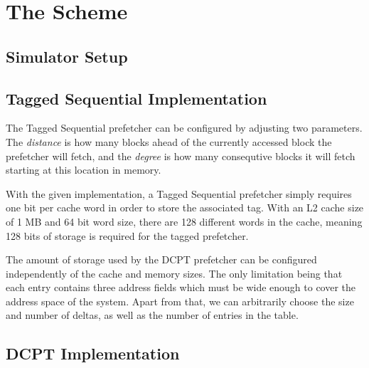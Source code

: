 \section{The Scheme}


\subsection{Simulator Setup}


\subsection{Tagged Sequential Implementation}


The Tagged Sequential prefetcher can be configured by adjusting two parameters.
The \emph{distance} is how many blocks ahead of the currently accessed block the
prefetcher will fetch, and the \emph{degree} is how many consequtive blocks it will
fetch starting at this location in memory.

With the given implementation, a Tagged Sequential prefetcher simply requires
one bit per cache word in order to store the associated tag. With an L2 cache
size of 1 MB and 64 bit word size, there are 128 different words in the cache,
meaning 128 bits of storage is required for the tagged prefetcher.

The amount of storage used by the DCPT prefetcher can be configured
independently of the cache and memory sizes. The only limitation being that each
entry contains three address fields which must be wide enough to cover the
address space of the system. Apart from that, we can arbitrarily choose the size
and number of deltas, as well as the number of entries in the table.


\subsection{DCPT Implementation}

